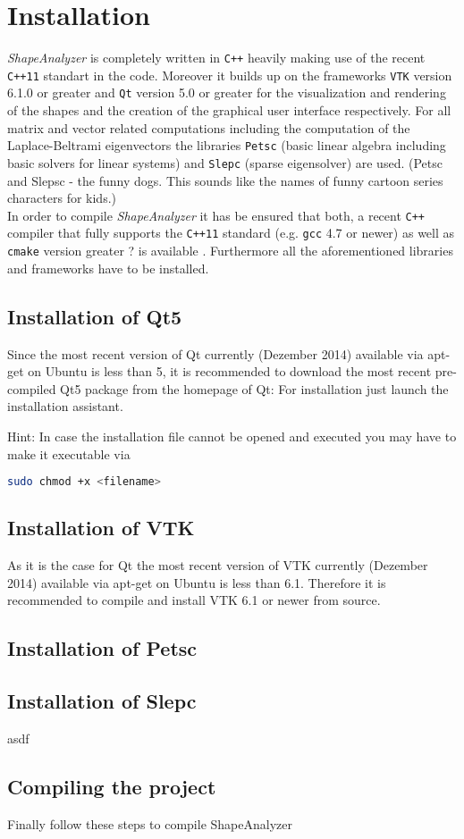 
\chapter{Installation}

\emph{ShapeAnalyzer} is completely written in \texttt{C++} heavily making use of the recent \texttt{C++11} standart in the code. Moreover it builds up on the frameworks \texttt{VTK} version 6.1.0 or greater and \texttt{Qt} version 5.0 or greater for the visualization and rendering of the shapes and the creation of the graphical user interface respectively. For all matrix and vector related computations including the computation of the Laplace-Beltrami eigenvectors the libraries \texttt{Petsc} (basic linear algebra including basic solvers for linear systems) and \texttt{Slepc} (sparse eigensolver) are used. (Petsc and Slepsc - the funny dogs. This sounds like the names of funny cartoon series characters for kids.)\\
In order to compile \emph{ShapeAnalyzer} it has be ensured that both, a recent \texttt{C++} compiler that fully supports the \texttt{C++11} standard (e.g. \texttt{gcc} 4.7 or newer) as well as \texttt{cmake} version greater ? is available . Furthermore all the aforementioned libraries and frameworks have to be installed.


\section{Installation of Qt5}
Since the most recent version of Qt currently (Dezember 2014) available via apt-get on Ubuntu is less than 5, it is recommended to download the most recent pre-compiled Qt5 package from the homepage of Qt: 
For installation just launch the installation assistant.

\begin{mdframed}
Hint: In case the installation file cannot be opened and executed you may have to make it executable via
\begin{lstlisting}[language=bash, numbers=none]
	sudo chmod +x <filename>
\end{lstlisting}
\end{mdframed}

\section{Installation of VTK}
As it is the case for Qt the most recent version of VTK currently (Dezember 2014) available via apt-get on Ubuntu is less than 6.1. Therefore it is recommended to compile and install VTK 6.1 or newer from source.

\section{Installation of Petsc}

\section{Installation of Slepc}
asdf


\section{Compiling the project}
Finally follow these steps to compile ShapeAnalyzer

